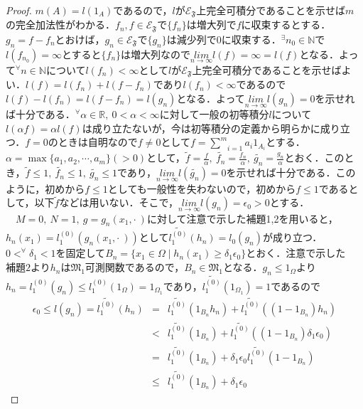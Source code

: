 \documentclass[a4paper,11pt]{jsarticle}
\newtheorem{proof}{証明}
\begin{document}
\begin{proof}
$m(A)=l(1_A)$であるので，$l$が$\mathcal{E}_\mathfrak{F}$上完全可積分であることを示せば$m$の完全加法性がわかる．$f_n,f\in\mathcal{E}_\mathfrak{F}$で$\{f_n\}$は増大列で$f$に収束するとする．$g_n=f-f_n$とおけば，$g_n\in\mathcal{E}_\mathfrak{F}$で$\{g_n\}$は減少列で$0$に収束する．$^\exists n_0\in\mathbb{N}$で$l(f_{n_0})=\infty$とすると$\{f_n\}$は増大列なので$\underset{n\to\infty}{lim}l(f)=\infty=l(f)$となる．よって$^\forall n\in\mathbb{N}$について$l(f_n)<\infty$として$l$が$\mathcal{E}_\mathfrak{F}$上完全可積分であることを示せばよい．$l(f)=l(f_n)+l(f-f_n)$であり$l(f_n)<\infty$であるので$l(f)-l(f_n)=l(f-f_n)=l(g_n)$となる．よって$\underset{n\to\infty}{lim}l(g_n)=0$を示せれば十分である．$^\forall \alpha\in\mathbb{R},{\ }0<\alpha<\infty$に対して一般の初等積分$l$について$l(\alpha f)=\alpha l(f)$は成り立たないが，今は初等積分の定義から明らかに成り立つ．$f=0$のときは自明なので$f\neq 0$として$f=\underset{i=1}{\overset{m}{\sum}}a_i1_{A_i}$とする．$\alpha=\max\{a_1,a_2,\cdots,a_m\}(>0)$として，$\widetilde{f}=\frac{f}{\alpha},{\ }\widetilde{f_n}=\frac{f_n}{\alpha},{\ }\widetilde{g_n}=\frac{g_n}{\alpha}$とおく．このとき，$\widetilde{f}\leq 1,{\ }\widetilde{f_n}\leq 1,{\ }\widetilde{g_n}\leq 1$であり，$\underset{n\to\infty}{lim}l(\widetilde{g_n})=0$を示せれば十分である．このように，初めから$f\leq 1$としても一般性を失わないので，初めから$f\leq 1$であるとして，以下$\widetilde{f}$などは用いない．そこで，$\underset{n\to\infty}{lim}l(g_n)=\epsilon_0>0$とする．\\
{\ }{\ }$M=0,{\ }N=1,{\ }g=g_n(x_1,\cdot{\ })$に対して注意で示した補題1,2を用いると，$h_n(x_1)=l^{(0)}_1(g_n(x_1,\cdot{\ }))$として$\widetilde{l^{(0)}_1}(h_n)=l_0(g_n)$が成り立つ．$0< ^\forall \delta_1<1$を固定して$B_n=\{x_1\in\Omega \mid h_n(x_1)\geq\delta_1\epsilon_0\}$とおく．注意で示した$補題2$より$h_n$は$\mathfrak{M}_1$可測関数であるので，$B_n\in\mathfrak{M}_1$となる．$g_n\leq 1_\Omega$より$h_n=l^{(0)}_1(g_n)\leq l^{(0)}_1(1_\Omega)=1_{\Omega_1}$であり，$\widetilde{l^{(0)}_1}(1_{\Omega_1})=1$であるので
\begin{eqnarray*}
\epsilon_0 \leq l(g_n)=\widetilde{l^{(0)}_1}(h_n)&=&\widetilde{l^{(0)}_1}(1_{B_n}h_n)+\widetilde{l^{(0)}_1}((1-1_{B_n})h_n) \\
&<&\widetilde{l^{(0)}_1}(1_{B_n})+\widetilde{l^{(0)}_1}((1-1_{B_n})\delta_1\epsilon_0) \\
&=&\widetilde{l^{(0)}_1}(1_{B_n})+\delta_1\epsilon_0\widetilde{l^{(0)}_1}(1-1_{B_n}) \\
&\leq&\widetilde{l^{(0)}_1}(1_{B_n})+\delta_1\epsilon_0

\end{eqnarray*}
\end{proof}
\end{document}
